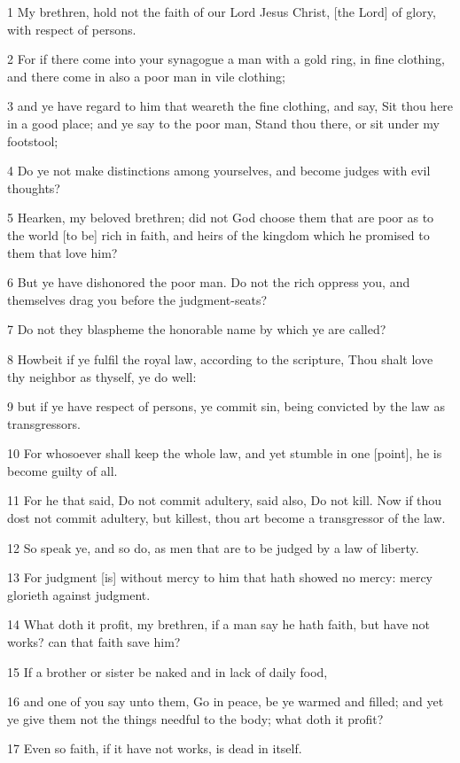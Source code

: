 \par 1 My brethren, hold not the faith of our Lord Jesus Christ, [the Lord] of glory, with respect of persons.
\par 2 For if there come into your synagogue a man with a gold ring, in fine clothing, and there come in also a poor man in vile clothing;
\par 3 and ye have regard to him that weareth the fine clothing, and say, Sit thou here in a good place; and ye say to the poor man, Stand thou there, or sit under my footstool;
\par 4 Do ye not make distinctions among yourselves, and become judges with evil thoughts?
\par 5 Hearken, my beloved brethren; did not God choose them that are poor as to the world [to be] rich in faith, and heirs of the kingdom which he promised to them that love him?
\par 6 But ye have dishonored the poor man. Do not the rich oppress you, and themselves drag you before the judgment-seats?
\par 7 Do not they blaspheme the honorable name by which ye are called?
\par 8 Howbeit if ye fulfil the royal law, according to the scripture, Thou shalt love thy neighbor as thyself, ye do well:
\par 9 but if ye have respect of persons, ye commit sin, being convicted by the law as transgressors.
\par 10 For whosoever shall keep the whole law, and yet stumble in one [point], he is become guilty of all.
\par 11 For he that said, Do not commit adultery, said also, Do not kill. Now if thou dost not commit adultery, but killest, thou art become a transgressor of the law.
\par 12 So speak ye, and so do, as men that are to be judged by a law of liberty.
\par 13 For judgment [is] without mercy to him that hath showed no mercy: mercy glorieth against judgment.
\par 14 What doth it profit, my brethren, if a man say he hath faith, but have not works? can that faith save him?
\par 15 If a brother or sister be naked and in lack of daily food,
\par 16 and one of you say unto them, Go in peace, be ye warmed and filled; and yet ye give them not the things needful to the body; what doth it profit?
\par 17 Even so faith, if it have not works, is dead in itself.

